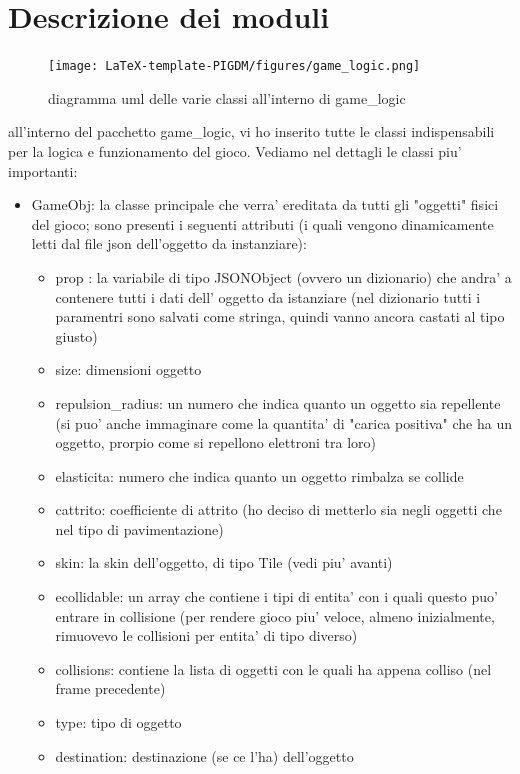 \documentclass[12pt,a4paper]{report}
\begin{document}
\section{Descrizione dei moduli}\label{se:appjgal}
\begin{figure}[h]
    \centering
    \texttt{[image: LaTeX-template-PIGDM/figures/game\_logic.png]}
    \caption{diagramma uml delle varie classi all'interno di game\_logic}
    \label{fig:enter-label}
\end{figure}
all'interno del pacchetto game\_logic, vi ho inserito tutte le classi indispensabili per la logica e funzionamento del gioco.
Vediamo nel dettagli le classi piu' importanti:


\begin{itemize}
\item GameObj: la classe principale che verra' ereditata da tutti gli "oggetti" fisici del gioco; sono presenti i seguenti attributi
(i quali vengono dinamicamente letti dal file json dell'oggetto da instanziare):
\begin{itemize}
\item prop : la variabile di tipo JSONObject (ovvero un dizionario) che andra' a contenere tutti i dati dell' oggetto da istanziare (nel dizionario tutti i paramentri sono salvati come stringa, quindi vanno ancora castati al tipo giusto)
\item size: dimensioni oggetto
\item repulsion\_radius: un numero che indica quanto un oggetto sia repellente (si puo' anche immaginare come la quantita' di "carica positiva" che ha un oggetto, prorpio come si repellono elettroni tra loro)
\item elasticita: numero che indica quanto un oggetto rimbalza se collide
\item cattrito: coefficiente di attrito (ho deciso di metterlo sia negli oggetti che nel tipo di pavimentazione)
\item skin: la skin dell'oggetto, di tipo Tile (vedi piu' avanti)
\item ecollidable: un array che contiene i tipi di entita' con i quali questo puo' entrare in collisione (per rendere gioco piu' veloce, almeno inizialmente, rimuovevo le collisioni per entita' di tipo diverso)
\item collisions: contiene la lista di oggetti con le quali ha appena colliso (nel frame precedente)
\item type: tipo di oggetto
\item destination: destinazione (se ce l'ha) dell'oggetto

\end{itemize}
\end{itemize}
\end{document}
